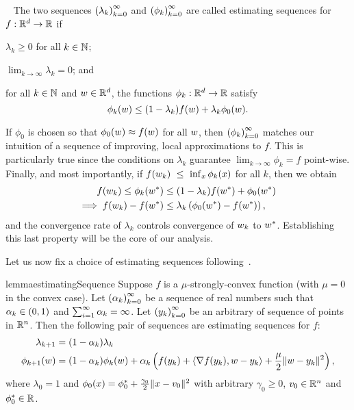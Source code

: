 \begin{definition}~\label{def:estimating_sequences}
    The two sequences \( \left(\lambda_k\right)_{k=0}^\infty \) and \( \left(\phi_k\right)_{k=0}^\infty \) are called estimating sequences for \( f : \mathbb{R}^d \rightarrow \mathbb{R} \) if
    \begin{inparaenum}[(i)]
        \item \( \lambda_k \geq 0 \) for all \( k \in \mathbb{N} \);
        \item \( \lim_{k\rightarrow \infty} \lambda_k = 0 \); and
        \item for all \( k \in \mathbb{N} \) and \( w \in \mathbb{R}^d \), the functions \( \phi_k: \mathbb{R}^d \rightarrow \mathbb{R} \) satisfy
        \[ \phi_k(w) \leq (1 - \lambda_k) f(w) + \lambda_k \phi_0(w). \]
    \end{inparaenum}
\end{definition}

If \( \phi_0 \) is chosen so that \( \phi_0(w) \approx f(w) \) for all \( w \), then \( \left(\phi_k\right)_{k=0}^\infty \) matches our intuition of a sequence of improving, local approximations to \( f \).
This is particularly true since the conditions on \( \lambda_k \) guarantee \( \lim_{k \rightarrow \infty} \phi_k = f \) point-wise.
Finally, and most importantly, if \( f(w_k)~\leq~\inf_x \phi_k(x) \) for all \( k \), then we obtain
\begin{align*}
    f(w_k) \leq \phi_k(w^*) &\leq (1 - \lambda_k) f(w^*) + \phi_0(w^*)\\
    \implies f(w_k) - f(w^*) &\leq \lambda_k \left(\phi_0(w^*) - f(w^*)\right),
\end{align*}
and the convergence rate of \( \lambda_k \) controls convergence of \( w_k \) to \( w^* \).
Establishing this last property will be the core of our analysis.

Let us now fix a choice of estimating sequences following~\citet[Lemma 2.2.2]{nesterov2004lectures}. 
\begin{restatable}{lemma}{estimatingSequence}\label{lemma:estimating-sequence}
    Suppose \( f \) is a \( \mu \)-strongly-convex function (with \( \mu = 0 \) in the convex case).
    Let \( \left(\alpha_{k}\right)_{k=0}^\infty \) be a sequence of real numbers such that \( \alpha_{k} \in (0,1) \) and \( \sum_{i=1}^\infty \alpha_{k} = \infty \). 
    Let \( \left(y_k\right)_{k=0}^\infty \) be an arbitrary of sequence of points in \( \mathbb{R}^n \).
    Then the following pair of sequences are estimating sequences for \( f \):
    \begin{align*}
        \lambda_{k+1} &= (1- \alpha_k) \lambda_k\\
        \phi_{k+1}(w) &= (1-\alpha_k) \phi_k(w) + \alpha_k \left(f(y_k) + \left\langle\nabla f(y_k), w - y_k\right\rangle + \frac{\mu}{2} \|w - y_k\|^2\right),
    \end{align*}
    where \( \lambda_0 = 1 \) and \( \phi_0(x) = \phi_0^* + \frac{\gamma_0}{2}\|x - v_0\|^2 \) with arbitrary \( \gamma_0 \geq 0 \), \( v_0 \in \mathbb{R}^n \) and \( \phi_0^* \in \mathbb{R} \).
\end{restatable}

